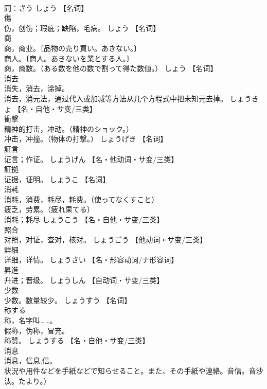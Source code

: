 \documentclass[8pt]{extreport}
\begin{document}
\begin{CJK}{UTF8}{min}
\\	同：ざう	しょう		【名词】
\\	傷	
\\	伤，创伤；瑕疵；缺陷，毛病。	しょう		【名词】
\\	商	
\\	商，商业。〔品物の売り買い。あきない。〕 
\\	商人。〔商人。あきないを業とする人。〕 
\\	商，商数。（ある数を他の数で割って得た数値。）	しょう		【名词】
\\	消去	
\\	消失，消去，涂掉。 
\\	消去，消元法，通过代入或加减等方法从几个方程式中把未知元去掉。	しょうきょ		【名・自他・サ变/三类】
\\	衝撃	
\\	精神的打击，冲动。（精神のショック。） 
\\	冲击，冲撞。（物体の打撃。）	しょうげき		【名词】
\\	証言	
\\	证言；作证。	しょうげん		【名・他动词・サ变/三类】
\\	証拠	
\\	证据，证明。	しょうこ		【名词】
\\	消耗	
\\	消耗，消费，耗尽，耗费。（使ってなくすこと） 
\\	疲乏，劳累。（疲れ果てる） 
\\	消耗；耗尽	しょうこう		【名・自他・サ变/三类】
\\	照合	
\\	对照，对证，查对，核对。	しょうごう		【他动词・サ变/三类】
\\	詳細	
\\	详细，详情。	しょうさい		【名・形容动词/ナ形容词】
\\	昇進	
\\	升进；晋级。	しょうしん		【自动词・サ变/三类】
\\	少数	
\\	少数。数量较少。	しょうすう		【名词】
\\	称する	
\\	称，名字叫……。 
\\	假称，伪称，冒充。 
\\	称赞。	しょうする		【名・自他・サ变/三类】
\\	消息	
\\	消息，信息,信。
\\	状況や用件などを手紙などで知らせること。また、その手紙や連絡。音信。音沙汰。たより。） 

\end{CJK}
\end{document}
